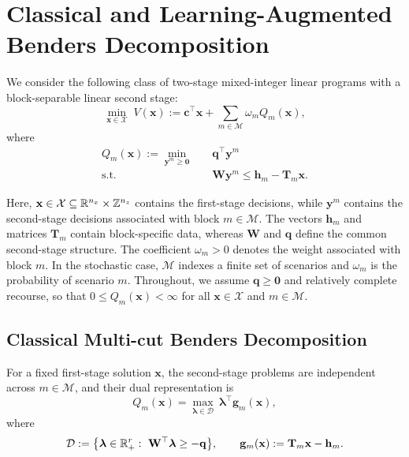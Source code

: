 \section{Classical and Learning-Augmented Benders Decomposition}\label{sec:setting}

We consider the following class of two-stage mixed-integer linear programs with a block-separable linear second stage:
\begin{equation}\label{eq:two-stage}
\min_{\mathbf x\in\mathcal X}\;V(\mathbf x):=\mathbf c^\top\mathbf x+\sum_{m\in\mathcal M}\omega_m Q_m(\mathbf x),
\end{equation}
where
\begin{align}
Q_m(\mathbf x):=\min_{\mathbf y^m\ge\mathbf 0}\quad & \mathbf q^\top\mathbf y^m \label{eq:recourse}\\
\text{s.t.}\quad & \mathbf W\mathbf y^m\le\mathbf h_m-\mathbf T_m\mathbf x. \nonumber
\end{align}

Here, $\mathbf x\in\mathcal X\subseteq\mathbb{R}^{n_x}\times\mathbb Z^{n_z}$ contains the first-stage decisions, while $\mathbf y^m$ contains the second-stage decisions associated with block $m\in\mathcal M$. The vectors $\mathbf h_m$ and matrices $\mathbf T_m$ contain block-specific data, whereas $\mathbf W$ and $\mathbf q$ define the common second-stage structure. The coefficient $\omega_m>0$ denotes the weight associated with block $m$. In the stochastic case, $\mathcal M$ indexes a finite set of scenarios and $\omega_m$ is the probability of scenario $m$. Throughout, we assume $\mathbf q\ge\mathbf 0$ and relatively complete recourse, so that $0\le Q_m(\mathbf x)<\infty$ for all $\mathbf x\in\mathcal X$ and $m\in\mathcal M$.

\subsection{Classical Multi-cut Benders Decomposition}\label{subsec:classical-bd}

For a fixed first-stage solution $\mathbf x$, the second-stage problems are independent across $m\in\mathcal M$, and their dual representation is
\begin{equation}\label{eq:dual-subproblem}
Q_m(\mathbf x)=\max_{\boldsymbol\lambda\in\mathcal D}\ \boldsymbol\lambda^\top\mathbf g_m(\mathbf x),
\end{equation}
where
\begin{equation}\label{eq:dual-set-state}
\mathcal D:=\bigl\{\boldsymbol\lambda\in\mathbb{R}_+^r:\ \mathbf W^\top\boldsymbol\lambda\ge-\mathbf q\bigr\},
\qquad
\mathbf g_m(\mathbf x):=\mathbf T_m\mathbf x-\mathbf h_m .
\end{equation}

